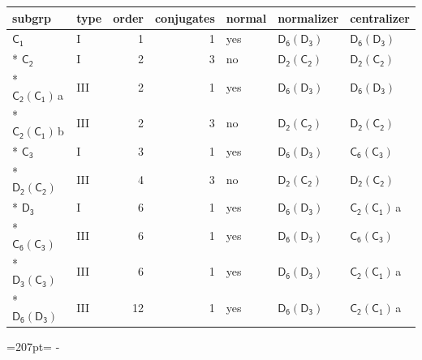\documentclass[10pt,a4paper]{article}
\newcommand{\needspace}[1]{\par\penalty-100\begingroup\dimen0=#1\relax\dimen2=\pagegoal
  \advance\dimen2-\pagetotal\ifdim\dimen0>\dimen2\relax\ifdim\dimen2>0pt\vfil\break\fi\fi
  \endgroup}
\numberwithin{equation}{section}
\newcommand{\grp}[1]{\mathsf{#1}}
\newcommand{\clsletter}[1]{\,{\scriptsize\color{black!55}#1}}
\begin{document}
{\small\begin{longtable}{@{}llrrlll@{}}\toprule
subgrp & type & order & conjugates & normal & normalizer & centralizer\\\midrule\endhead
\bottomrule\endfoot\endlastfoot
\href{../../../rotation/data/pdf/C1.pdf}{$\grp{C_{1}}$} & I & 1 & 1 & yes & \href{D6-D3.pdf}{$\grp{D_{6}}(\grp{D_{3}})$} & \href{D6-D3.pdf}{$\grp{D_{6}}(\grp{D_{3}})$}\\*
\href{../../../rotation/data/pdf/C2.pdf}{$\grp{C_{2}}$} & I & 2 & 3 & no & \href{D2-C2.pdf}{$\grp{D_{2}}(\grp{C_{2}})$} & \href{D2-C2.pdf}{$\grp{D_{2}}(\grp{C_{2}})$}\\*
\href{C2-C1.pdf}{$\grp{C_{2}}(\grp{C_{1}})$}\clsletter{a} & III & 2 & 1 & yes & \href{D6-D3.pdf}{$\grp{D_{6}}(\grp{D_{3}})$} & \href{D6-D3.pdf}{$\grp{D_{6}}(\grp{D_{3}})$}\\*
\href{C2-C1.pdf}{$\grp{C_{2}}(\grp{C_{1}})$}\clsletter{b} & III & 2 & 3 & no & \href{D2-C2.pdf}{$\grp{D_{2}}(\grp{C_{2}})$} & \href{D2-C2.pdf}{$\grp{D_{2}}(\grp{C_{2}})$}\\*
\href{../../../rotation/data/pdf/C3.pdf}{$\grp{C_{3}}$} & I & 3 & 1 & yes & \href{D6-D3.pdf}{$\grp{D_{6}}(\grp{D_{3}})$} & \href{C6-C3.pdf}{$\grp{C_{6}}(\grp{C_{3}})$}\\*
\href{D2-C2.pdf}{$\grp{D_{2}}(\grp{C_{2}})$} & III & 4 & 3 & no & \href{D2-C2.pdf}{$\grp{D_{2}}(\grp{C_{2}})$} & \href{D2-C2.pdf}{$\grp{D_{2}}(\grp{C_{2}})$}\\*
\href{../../../rotation/data/pdf/D3.pdf}{$\grp{D_{3}}$} & I & 6 & 1 & yes & \href{D6-D3.pdf}{$\grp{D_{6}}(\grp{D_{3}})$} & \href{C2-C1.pdf}{$\grp{C_{2}}(\grp{C_{1}})$}\clsletter{a}\\*
\href{C6-C3.pdf}{$\grp{C_{6}}(\grp{C_{3}})$} & III & 6 & 1 & yes & \href{D6-D3.pdf}{$\grp{D_{6}}(\grp{D_{3}})$} & \href{C6-C3.pdf}{$\grp{C_{6}}(\grp{C_{3}})$}\\*
\href{D3-C3.pdf}{$\grp{D_{3}}(\grp{C_{3}})$} & III & 6 & 1 & yes & \href{D6-D3.pdf}{$\grp{D_{6}}(\grp{D_{3}})$} & \href{C2-C1.pdf}{$\grp{C_{2}}(\grp{C_{1}})$}\clsletter{a}\\*
\href{D6-D3.pdf}{$\grp{D_{6}}(\grp{D_{3}})$} & III & 12 & 1 & yes & \href{D6-D3.pdf}{$\grp{D_{6}}(\grp{D_{3}})$} & \href{C2-C1.pdf}{$\grp{C_{2}}(\grp{C_{1}})$}\clsletter{a}\\
\bottomrule\end{longtable}}
\needspace{207pt}
\end{document}
